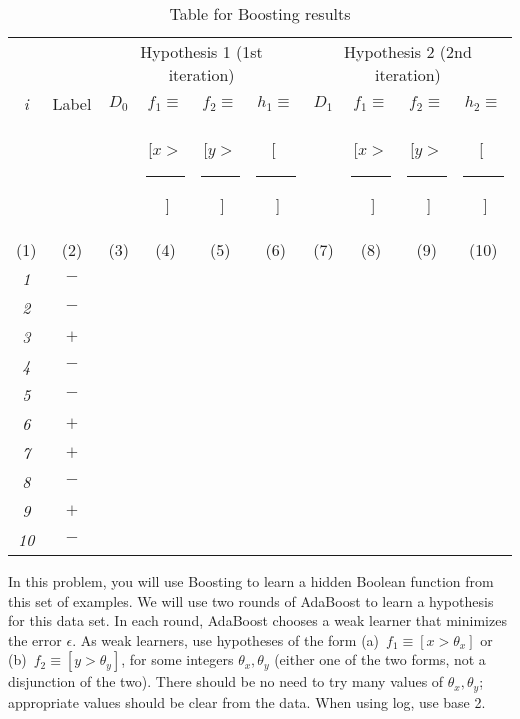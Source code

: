 \documentclass[11pt]{article}
\begin{document}
    \begin{table}[!t]
      {\centering
        \begin{tabular}{|c|c||c|c|c|c||c|c|c|c|}

          \hline
          & & \multicolumn{4}{c||}{Hypothesis 1 (1st iteration)}
	  & \multicolumn{4}{c|}{Hypothesis 2 (2nd iteration)} \\
          \cline{3-10}
          {\em i} & Label & $D_0$ & $f_1 \equiv $ & $f_2 \equiv $ & $h_1\equiv$ & $D_1$ &  $f_1 \equiv $ & $f_2 \equiv $ & $h_2 \equiv $ \\
          & & & [$x >$\rule[-2pt]{3mm}{0.2pt}$\;$] & [$y >$\rule[-2pt]{3mm}{0.2pt}$\;$] & [$\;$\rule[-2pt]{1cm}{0.2pt}$\;$] & & [$x >$\rule[-2pt]{3mm}{0.2pt}$\;$] & [$y >$\rule[-2pt]{3mm}{0.2pt}$\;$] & [$\;$\rule[-2pt]{1cm}{0.2pt}$\;$] \\

          \tiny{(1)} & \tiny{(2)} & \tiny{(3)} & \tiny{(4)} &  \tiny{(5)} & \tiny{(6)} & \tiny{(7)} & \tiny{(8)} & \tiny{(9)} & \tiny{(10)}\\
          \hline \hline
          {\em 1} & $-$ & & & & & & & &  \\
          \hline
          {\em 2} & $-$ & & & & & & & &  \\
          \hline
          {\em 3} & $+$ & & & & & & & & \\
          \hline
          {\em 4} & $-$ & & & & & & & & \\
          \hline
          {\em 5} & $-$ & & & & & & & & \\
          \hline
          {\em 6} & $+$ & & & & & & & & \\
          \hline
          {\em 7} & $+$ & & & & & & & & \\
          \hline
          {\em 8} & $-$ & & & & & & & & \\
          \hline
          {\em 9} & $+$ & & & & & & & & \\
          \hline
          {\em 10} & $-$ & & & & & & & & \\
          \hline
        \end{tabular}
        \caption{Table for Boosting results}\label{table:ltu}}
    \end{table}


  In this problem, you will use Boosting to learn a hidden Boolean function from this set of examples.
We will use two rounds of AdaBoost to learn a hypothesis for this
    data set. In each round, AdaBoost chooses a weak learner that minimizes the error $\epsilon$. As weak learners, use hypotheses of the form (a)~$f_1 \equiv [x
    > \theta_x]$ or (b)~$f_2 \equiv [y > \theta_y]$, for some integers $\theta_x, \theta_y$ (either one of the two forms, not a disjunction of the two). There should be no need to try many values of $\theta_x, \theta_y$;
    appropriate values should be clear from the data. When using log, use base 2. 
\end{document}
